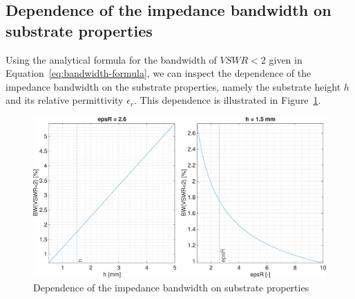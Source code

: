 \documentclass[11pt,a4paper]{article}
\begin{document}
        \subsection{Dependence of the impedance bandwidth on substrate properties}
            Using the analytical formula for the bandwidth of $\mathit{VSWR} < 2$ given in Equation~\ref{eq:bandwidth-formula}, we can inspect the dependence of the impedance bandwidth on the substrate properties, namely the substrate height $h$ and its relative permittivity $\epsilon_r$. This dependence is illustrated in Figure~\ref{fig:bandwidth-material-dependence}.
            \begin{figure}[!ht]
                \centering
                \includegraphics[width=\textwidth]{src/bandwidth-material-dependence.eps}
                \caption{\label{fig:bandwidth-material-dependence}Dependence of the impedance bandwidth on substrate properties}
            \end{figure}
\end{document}
